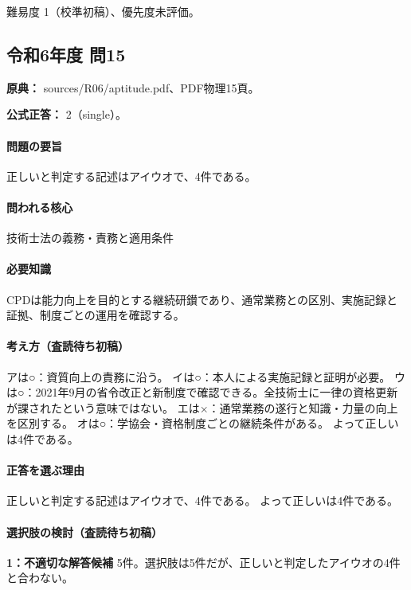 \par 難易度 1（校準初稿）、優先度未評価。

\subsection{令和6年度 問15}
\label{q:r06-reg-apt-15}

\noindent\textbf{原典：} sources/R06/aptitude.pdf、PDF物理15頁。

\textbf{公式正答：} 2（single）。

\paragraph{問題の要旨} 正しいと判定する記述はアイウオで、4件である。

\paragraph{問われる核心} 技術士法の義務・責務と適用条件

\paragraph{必要知識} CPDは能力向上を目的とする継続研鑚であり、通常業務との区別、実施記録と証拠、制度ごとの運用を確認する。

\paragraph{考え方（査読待ち初稿）} アは○：資質向上の責務に沿う。 イは○：本人による実施記録と証明が必要。 ウは○：2021年9月の省令改正と新制度で確認できる。全技術士に一律の資格更新が課されたという意味ではない。 エは×：通常業務の遂行と知識・力量の向上を区別する。 オは○：学協会・資格制度ごとの継続条件がある。 よって正しいは4件である。

\paragraph{正答を選ぶ理由} 正しいと判定する記述はアイウオで、4件である。  よって正しいは4件である。

\paragraph{選択肢の検討（査読待ち初稿）}

\noindent\textbf{1：不適切な解答候補} 5件。選択肢は5件だが、正しいと判定したアイウオの4件と合わない。\par

